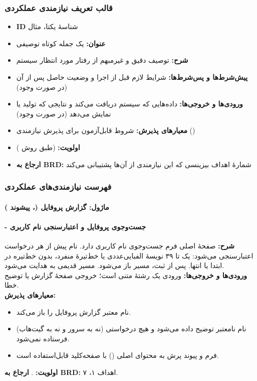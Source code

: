 \documentclass[12pt]{article}
\newcommand{\code}[1]{\lr{\texttt{#1}}}
\begin{document}
 \subsubsection{قالب تعریف نیازمندی عملکردی}
\begin{itemize}
\item \textbf{ID} شناسهٔ یکتا، مثال 
\item \textbf{عنوان:} یک جمله کوتاه توصیفی
\item \textbf{شرح:} توصیف دقیق و غیرمبهم از رفتار مورد انتظار سیستم
\item \textbf{پیش‌شرط‌ها و پس‌شرط‌ها:} شرایط لازم قبل از اجرا و وضعیت حاصل پس از آن (در صورت وجود)
\item \textbf{ورودی‌ها و خروجی‌ها:} داده‌هایی که سیستم دریافت می‌کند و نتایجی که تولید یا نمایش می‌دهد (در صورت وجود)
\item \textbf{معیارهای پذیرش:} شروط قابل‌آزمون برای پذیرش نیازمندی ()
\item \textbf{اولویت:}  (طبق روش )
\item \textbf{ارجاع به BRD:} شمارهٔ اهداف بیزینسی که این نیازمندی از آن‌ها پشتیبانی می‌کند
\end{itemize}
 \subsubsection{فهرست نیازمندی‌های عملکردی}
 \paragraph{ماژول: گزارش پروفایل (، پیشوند )}
 \paragraph{ - جست‌وجوی پروفایل و اعتبارسنجی نام کاربری}
\textbf{شرح:} صفحهٔ اصلی فرم جست‌وجوی نام کاربری دارد. نام پیش از هر درخواست اعتبارسنجی می‌شود: یک تا ۳۹ نویسهٔ الفبایی‌عددی یا خط‌تیرهٔ منفرد، بدون خط‌تیره در ابتدا یا انتها. پس از ثبت، مسیر \code{/user/<name>} باز می‌شود. مسیر قدیمی \code{/user?id=} به \code{/user/[id]} هدایت می‌شود.
\\
\textbf{ورودی‌ها و خروجی‌ها:} ورودی یک رشتهٔ متنی است؛ خروجی صفحهٔ گزارش یا توضیح خطا.
\\
\textbf{معیارهای پذیرش:}
\begin{itemize}
\item نام معتبر گزارش پروفایل را باز می‌کند.
\item نام نامعتبر توضیح داده می‌شود و هیچ درخواستی (نه به سرور و نه به گیت‌هاب) فرستاده نمی‌شود.
\item فرم و پیوند پرش به محتوای اصلی () با صفحه‌کلید قابل‌استفاده است.
\end{itemize}
\textbf{اولویت:} . \textbf{ارجاع به BRD:} اهداف ۱، ۷.
\end{document}
